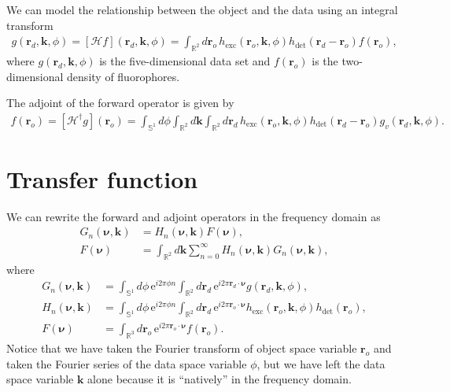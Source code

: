 \documentclass[11pt]{article}
\newcommand{\me}{\mathrm{e}}
\providecommand{\mb}[1]{\mathbf{#1}}
\providecommand{\mc}[1]{\mathcal{#1}}
\providecommand{\ro}[1]{\mathbf{r}_o}
\providecommand{\rd}[1]{\mathbf{r}_d}
\providecommand{\mbb}[1]{\mathbb{#1}}
\providecommand{\bs}[1]{\boldsymbol{#1}}
\begin{document}
We can model the relationship between the object and the data using an integral
transform
\begin{align}
  g(\rd{}, \mb{k}, \phi) = \left[\mc{H}f\right](\rd{}, \mb{k}, \phi) = \int_{\mbb{R}^2}d\ro{}\, h_{\text{exc}}(\ro{}, \mb{k}, \phi)h_{\text{det}}(\rd{} - \ro{})f(\ro{}), 
\end{align}
where $g(\rd{}, \mb{k}, \phi)$ is the five-dimensional data set and $f(\ro{})$ is
the two-dimensional density of fluorophores. 

The adjoint of the forward operator is given by
\begin{align}
  f(\ro{}) = [\mc{H}^{\dagger}g](\ro{}) = \int_{\mbb{S}^1}d\phi\int_{\mbb{R}^2}d\mb{k}\int_{\mbb{R}^2}d\rd{}\, h_{\text{exc}}(\ro{}, \mb{k}, \phi)h_{\text{det}}(\rd{} - \ro{})g_v(\rd{}, \mb{k}, \phi). 
\end{align}
\section{Transfer function}
We can rewrite the forward and adjoint operators in the frequency domain as
\begin{align}
  G_n(\bs{\nu}, \mb{k}) &= H_{n}(\bs{\nu}, \mb{k})F(\bs{\nu}), \label{eq:fwd} \\
  F(\bs{\nu}) &= \int_{\mbb{R}^2} d\mb{k}\sum_{n=0}^{\infty} H_{n}(\bs{\nu}, \mb{k})G_{n}(\bs{\nu}, \mb{k}),\label{eq:adj}
\end{align}
where
\begin{align}
  G_n(\bs{\nu}, \mb{k}) &= \int_{\mbb{S}^1}d\phi\, \me{}^{i2\pi\phi n}\int_{\mbb{R}^2}d\rd{}\, \me{}^{i2\pi\rd{}\cdot\bs{\nu}} g(\rd{}, \mb{k}, \phi),\\
  H_n(\bs{\nu}, \mb{k}) &= \int_{\mbb{S}^1}d\phi\, \me{}^{i2\pi\phi n}\int_{\mbb{R}^2}d\rd{}\, \me{}^{i2\pi\ro{}\cdot\bs{\nu}} h_{\text{exc}}(\ro{}, \mb{k}, \phi)h_{\text{det}}(\ro{}), \label{eq:trans}\\  
  F(\bs{\nu}) &= \int_{\mbb{R}^3}d\ro{}\, \me{}^{i2\pi\ro{}\cdot\bs{\nu}}f(\ro{}).
\end{align}
Notice that we have taken the Fourier transform of object space variable $\ro{}$
and taken the Fourier series of the data space variable $\phi$, but we have left
the data space variable $\mb{k}$ alone because it is ``natively'' in the
frequency domain. 
\end{document}
